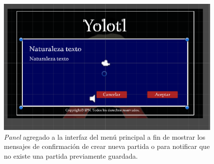 \begin{figure}[h]
		\centering
		\includegraphics[height=0.2 \textheight]{03TrabajoRealizado/imagenes/menuctrlPanel.png}
		\caption{\textit{Panel} agregado a la interfaz del menú principal a fin 
		de mostrar los mensajes de confirmación de crear nueva partida o para 
		notificar que no existe una partida previamente guardada.}
		\label{fig:menuctrlPanel}
\end{figure}
 
